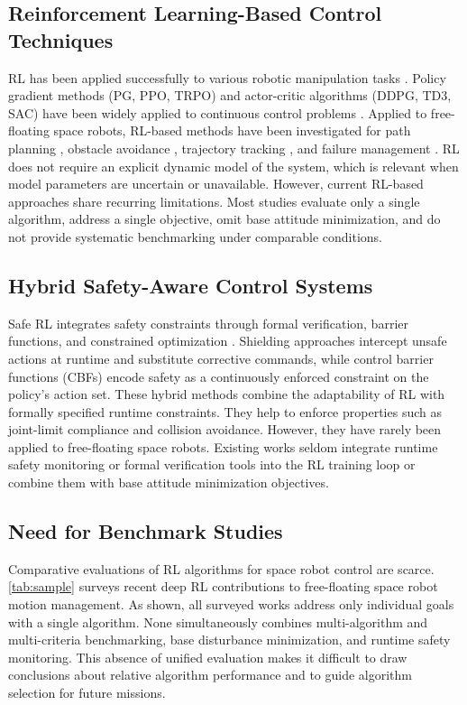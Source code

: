 \documentclass{ieeeaccess}
\begin{document}
\subsection{Reinforcement Learning-Based Control Techniques}
RL has been applied successfully to various robotic manipulation tasks \cite{b2,b7}. Policy gradient
methods (PG, PPO, TRPO) and actor-critic algorithms (DDPG, TD3, SAC) have been widely applied to
continuous control problems \cite{b14,b15,b17,b18,b21}. Applied to free-floating space robots, RL-based
methods have been investigated for path planning \cite{wu2020reinforcement,al2024path}, obstacle
avoidance \cite{huang2023obstacle}, trajectory tracking \cite{hu2025deep}, and failure management
\cite{d2024failure}. RL does not require an explicit dynamic model of the system, which is relevant when
model parameters are uncertain or unavailable. However, current RL-based approaches share recurring
limitations. Most studies evaluate only a single algorithm, address a single objective, omit base
attitude minimization, and do not provide systematic benchmarking under comparable conditions.

\subsection{Hybrid Safety-Aware Control Systems}
Safe RL integrates safety constraints through formal verification,
barrier functions, and constrained optimization \cite{b22,b23,b24,b34}.
Shielding approaches \cite{b23} intercept unsafe actions at runtime and substitute corrective commands,
while control barrier functions (CBFs) \cite{b34} encode safety as a continuously enforced constraint on
the policy's action set.
These hybrid methods combine the adaptability of RL with formally specified runtime constraints. They help to
enforce properties such as joint-limit compliance and collision avoidance. However, they have rarely been applied to
free-floating space robots. Existing works seldom integrate runtime safety monitoring or formal
verification tools into the RL training loop or combine them with base attitude minimization objectives.

\subsection{Need for Benchmark Studies}
Comparative evaluations of RL algorithms for space robot control are scarce. \cref{tab:sample} surveys
recent deep RL contributions to free-floating space robot motion management. As shown, all surveyed works
address only individual goals with a single algorithm. None simultaneously combines multi-algorithm and
multi-criteria benchmarking, base disturbance minimization, and runtime safety
monitoring. This absence of unified evaluation makes it difficult to draw conclusions about relative
algorithm performance and to guide algorithm selection for future missions.
\end{document}
